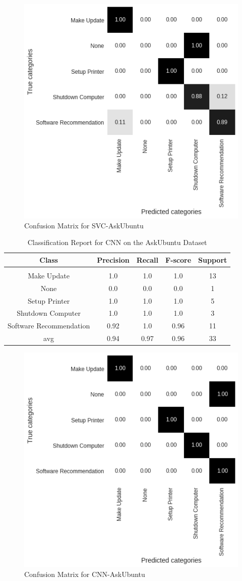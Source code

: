 \documentclass[11pt, oneside]{article}   	%
\begin{document}
\begin{figure}[h]
\centering
\includegraphics[width=0.6\linewidth]{SVC-AskUbuntu}
\caption{Confusion Matrix for SVC-AskUbuntu}
\label{fig:SVC-AskUbuntu}
\end{figure}

\newpage
\begin{table}[h]
\centering
\caption{Classification Report for CNN on the AskUbuntu Dataset}
\begin{tabular}{c | c c c c}
Class & Precision & Recall & F-score & Support\\
\hline
\hline\\
Make Update & 1.0 & 1.0 & 1.0 & 13\\
None & 0.0 & 0.0 & 0.0 & 1\\
Setup Printer & 1.0 & 1.0 & 1.0 & 5\\
Shutdown Computer & 1.0 & 1.0 & 1.0 & 3\\
Software Recommendation & 0.92 & 1.0 & 0.96 & 11\\
avg & 0.94 & 0.97 & 0.96 & 33\\
\end{tabular}
\end{table}

\begin{figure}[h]
\centering
\includegraphics[width=0.6\linewidth]{CNN-AskUbuntu}
\caption{Confusion Matrix for CNN-AskUbuntu}
\label{fig:CNN-AskUbuntu}
\end{figure}
\end{document}
